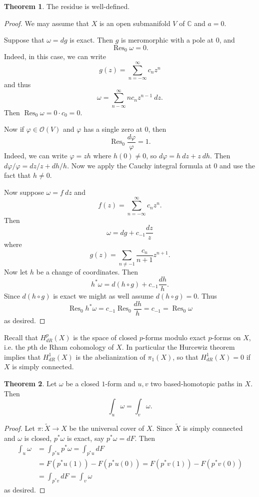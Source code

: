 \documentclass[12pt]{book}
\newcommand{\CC}{\mathbb{C}}
\newcommand{\Olo}{\mathscr O}
\DeclareMathOperator{\Res}{Res}
\theoremstyle{definition}
\newtheorem{theorem}{Theorem}[chapter]
\begin{document}
\begin{theorem}
The residue is well-defined.
\end{theorem}
\begin{proof}
We may assume that $X$ is an open submanifold $V$ of $\CC$ and $a = 0$.

Suppose that $\omega = dg$ is exact. Then $g$ is meromorphic with a pole at $0$, and
$$\Res_0 \omega = 0.$$
Indeed, in this case, we can write
$$g(z) = \sum_{n=-\infty}^\infty c_n z^n$$
and thus
$$\omega = \sum_{n-\infty}^\infty nc_n z^{n-1} ~dz.$$
Then $\Res_0 \omega = 0 \cdot c_0 = 0$.

Now if $\varphi \in \Olo(V)$ and $\varphi$ has a single zero at $0$, then
$$\Res_0 \frac{d\varphi}{\varphi} = 1.$$
Indeed, we can write $\varphi = zh$ where $h(0) \neq 0$, so $d\varphi = h~dz + z ~dh$.
Then $d\varphi/\varphi = dz/z + dh/h$. Now we apply the Cauchy integral formula at $0$ and use the fact that $h \neq 0$.

Now suppose $\omega = f~dz$ and
$$f(z) = \sum_{n=-\infty}^\infty c_n z^n.$$
Then
$$\omega = dg + c_{-1} \frac{dz}{z}$$
where
$$g(z) = \sum_{n \neq -1} \frac{c_n}{n+1} z^{n+1}.$$
Now let $h$ be a change of coordinates. Then
$$h^*\omega = d(h \circ g)+ c_{-1} \frac{dh}{h}.$$
Since $d(h \circ g)$ is exact we might as well assume $d(h \circ g) = 0$. Thus
$$\Res_0 h^*\omega = c_{-1} \Res_0 \frac{dh}{h} = c_{-1} = \Res_0 \omega$$
as desired.
\end{proof}

Recall that $H^p_{dR}(X)$ is the space of closed $p$-forms modulo exact $p$-forms on $X$, i.e. the $p$th de Rham cohomology of $X$.
In particular the Hurcewiz theorem implies that $H^1_{dR}(X)$ is the abelianization of $\pi_1(X)$, so that $H^1_{dR}(X) = 0$ if $X$ is simply connected.

\begin{theorem}
Let $\omega$ be a closed $1$-form and $u,v$ two based-homotopic paths in $X$. Then
$$\int_u \omega = \int_v \omega.$$
\end{theorem}
\begin{proof}
Let $\pi: \tilde X \to X$ be the universal cover of $X$.
Since $\tilde X$ is simply connected and $\omega$ is closed, $p^*\omega$ is exact, say $p^*\omega = dF$.
Then
\begin{align*}\int_u \omega &= \int_{p^*u} p^*\omega = \int_{p^*u} dF\\
&= F(p^*u(1)) - F(p^*u(0)) = F(p^*v(1)) - F(p^*v(0))\\
&= \int_{p^*v} dF = \int_v \omega
\end{align*}
as desired.
\end{proof}
\end{document}
